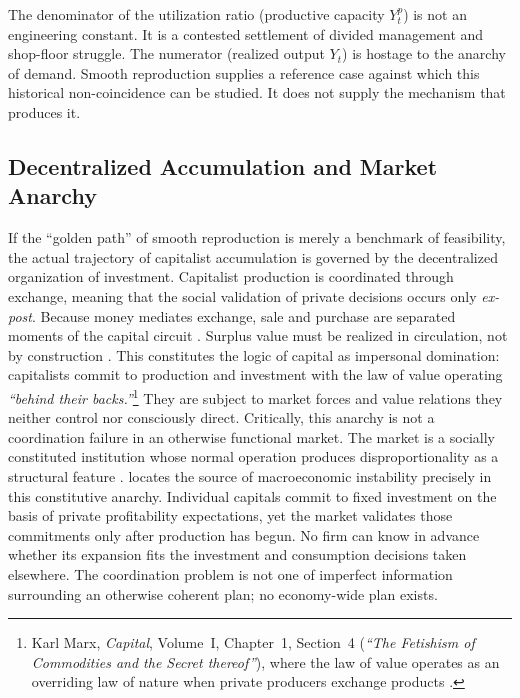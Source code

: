 The denominator of the utilization ratio (productive capacity
$Y^p_t$) is not an engineering constant. It is a contested
settlement of divided management and shop-floor struggle. The
numerator (realized output $Y_t$) is hostage to the anarchy of
demand. Smooth reproduction supplies a reference case against
which this historical non-coincidence can be studied. It does not
supply the mechanism that produces it.

\subsection{Decentralized Accumulation and Market Anarchy}

If the ``golden path'' of smooth reproduction is merely a
benchmark of feasibility, the actual trajectory of capitalist
accumulation is governed by the decentralized organization of
investment. Capitalist production is coordinated through
exchange, meaning that the social validation of private
decisions occurs only \textit{ex-post}. Because money mediates
exchange, sale and purchase are separated moments of the capital
circuit \citep{Basu2022}. Surplus value must be realized in
circulation, not by construction \citep{Foley1985, Trigg2020}.
This constitutes the logic of capital as impersonal domination:
capitalists commit to production and investment with the law of
value operating \textit{``behind their backs.''}\footnote{Karl
	Marx, \textit{Capital}, Volume~I, Chapter~1, Section~4 (\textit{``The
	Fetishism of Commodities and the Secret thereof''}), where the
	law of value operates as an overriding law of nature when
	private producers exchange products \citep{MarxKVI}.} They are subject to market
forces and value relations they neither control nor consciously
direct. Critically, this anarchy is not a coordination failure
in an otherwise functional market. The market is a socially
constituted institution whose normal operation produces
disproportionality as a structural feature
\citep{VidalPeck2012}. \citet{Okishio2022} locates the source
of macroeconomic instability precisely in this constitutive
anarchy. Individual capitals commit to fixed investment on the
basis of private profitability expectations, yet the market validates
those commitments only after production has begun. No firm can
know in advance whether its expansion fits the investment and
consumption decisions taken elsewhere. The coordination problem
is not one of imperfect information surrounding an otherwise
coherent plan; no economy-wide plan exists.

